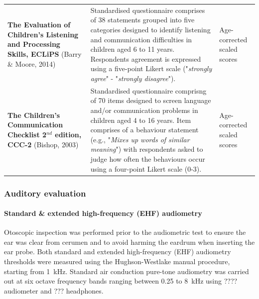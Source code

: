\documentclass[a4paper, twoside]{templates/ociamthesis}
\begin{document}
\begin{table}
{\begin{tabular}[t]{>{\raggedright\arraybackslash}p{12em}>{\raggedright\arraybackslash}p{24em}>{\raggedright\arraybackslash}p{10em}}
\textbf{The Evaluation of Children's Listening and Processing Skills, ECLiPS} (Barry \& Moore, 2014) & Standardised questionnaire comprises of 38  statements grouped into five categories designed to identify listening and communication difficulties in children aged 6 to 11 years. Respondents agreement is expressed using a five-point Likert scale ("\textit{strongly agree}" - "\textit{strongly disagree}"). & Age-corrected scaled scores\\
\textbf{The Children's Communication Checklist 2$^{nd}$ edition, CCC-2} (Bishop, 2003) & Standardised questionnaire comprisng of 70 items designed to screen language and/or communication problems in children aged 4 to 16 years. Item comprises of a behaviour statement (e.g., "\textit{Mixes up words of similar meaning}") with respondents asked to judge how often the behaviours occur using a four-point Likert scale (0-3). & Age-corrected scaled scores\\
\bottomrule
\end{tabular}}
\end{table}

\hypertarget{auditory-evaluation}{%
\subsubsection{Auditory evaluation}\label{auditory-evaluation}}

\hypertarget{standard-extended-high-frequency-ehf-audiometry}{%
\paragraph*{Standard \& extended high-frequency (EHF) audiometry}\label{standard-extended-high-frequency-ehf-audiometry}}

\hfill\break
Otoscopic inspection was performed prior to the audiometric test to ensure the ear was clear from cerumen and to avoid harming the eardrum when inserting the ear probe. Both standard and extended high-frequency (EHF) audiometry thresholds were measured using the Hughson-Westlake manual procedure, starting from 1~kHz. Standard air conduction pure-tone audiometry was carried out at six octave frequency bands ranging between 0.25 to 8~kHz using ???? audiometer and ??? headphones.\\
\end{document}
